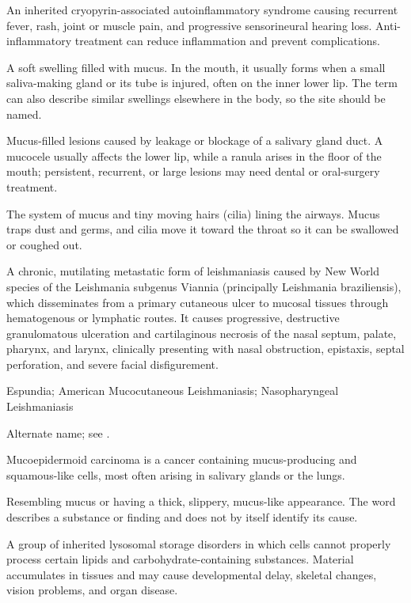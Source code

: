  An inherited cryopyrin-associated autoinflammatory syndrome causing recurrent fever, rash, joint or muscle pain, and progressive sensorineural hearing loss. Anti-inflammatory treatment can reduce inflammation and prevent complications.

 A soft swelling filled with mucus. In the mouth, it usually forms when a small saliva-making gland or its tube is injured, often on the inner lower lip. The term can also describe similar swellings elsewhere in the body, so the site should be named.

 Mucus-filled lesions caused by leakage or blockage of a salivary gland duct. A mucocele usually affects the lower lip, while a ranula arises in the floor of the mouth; persistent, recurrent, or large lesions may need dental or oral-surgery treatment.

 The system of mucus and tiny moving hairs (cilia) lining the airways. Mucus traps dust and germs, and cilia move it toward the throat so it can be swallowed or coughed out.

 A chronic, mutilating metastatic form of leishmaniasis caused by New World species of the Leishmania subgenus Viannia (principally Leishmania braziliensis), which disseminates from a primary cutaneous ulcer to mucosal tissues through hematogenous or lymphatic routes. It causes progressive, destructive granulomatous ulceration and cartilaginous necrosis of the nasal septum, palate, pharynx, and larynx, clinically presenting with nasal obstruction, epistaxis, septal perforation, and severe facial disfigurement.

\synonyms
Espundia; American Mucocutaneous Leishmaniasis; Nasopharyngeal Leishmaniasis

 Alternate name; see .

 Mucoepidermoid carcinoma is a cancer containing mucus-producing and squamous-like cells, most often arising in salivary glands or the lungs.

 Resembling mucus or having a thick, slippery, mucus-like appearance. The word describes a substance or finding and does not by itself identify its cause.

 A group of inherited lysosomal storage disorders in which cells cannot properly process certain lipids and carbohydrate-containing substances. Material accumulates in tissues and may cause developmental delay, skeletal changes, vision problems, and organ disease.

